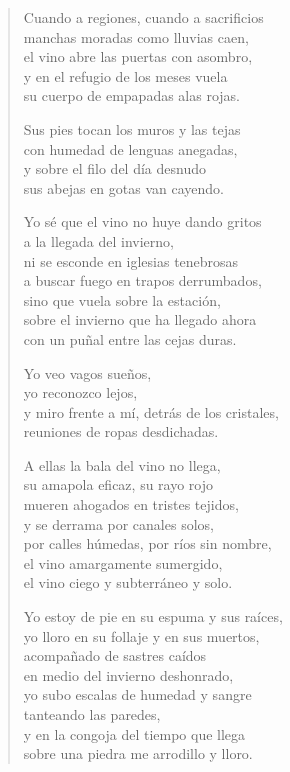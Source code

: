 \documentclass[12pt]{article}
\begin{document}
\clearpage
{}
\begin{verse}

Cuando a regiones, cuando a sacrificios\\
manchas moradas como lluvias caen,\\
el vino abre las puertas con asombro,\\
y en el refugio de los meses vuela\\
su cuerpo de empapadas alas rojas.  

Sus pies tocan los muros y las tejas\\
con humedad de lenguas anegadas,\\
y sobre el filo del día desnudo\\
sus abejas en gotas van cayendo.  

Yo sé que el vino no huye dando gritos\\
a la llegada del invierno,\\
ni se esconde en iglesias tenebrosas\\
a buscar fuego en trapos derrumbados,\\
sino que vuela sobre la estación,\\
sobre el invierno que ha llegado ahora\\
con un puñal entre las cejas duras.  

Yo veo vagos sueños,\\
yo reconozco lejos,\\
y miro frente a mí, detrás de los cristales,\\
reuniones de ropas desdichadas.  

A ellas la bala del vino no llega,\\
su amapola eficaz, su rayo rojo\\
mueren ahogados en tristes tejidos,\\
y se derrama por canales solos,\\
por calles húmedas, por ríos sin nombre,\\
el vino amargamente sumergido,\\
el vino ciego y subterráneo y solo.  

Yo estoy de pie en su espuma y sus raíces,\\
yo lloro en su follaje y en sus muertos,\\
acompañado de sastres caídos\\
en medio del invierno deshonrado,\\
yo subo escalas de humedad y sangre\\
tanteando las paredes,\\
y en la congoja del tiempo que llega\\
sobre una piedra me arrodillo y lloro.  


\end{verse}
\end{document}
